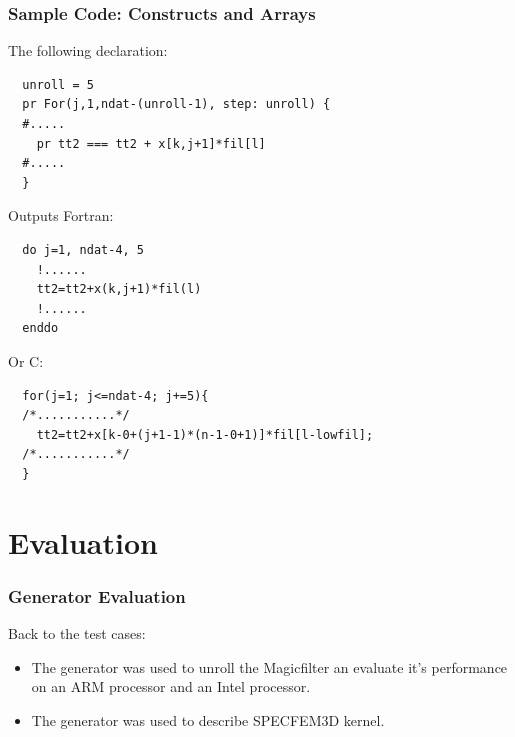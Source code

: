 \documentclass{beamer}
\begin{document}
\begin{frame}[fragile]
\frametitle{Sample Code: Constructs and Arrays}
The following declaration:
\tiny
{}
\begin{lstlisting}
  unroll = 5
  pr For(j,1,ndat-(unroll-1), step: unroll) {
  #.....
    pr tt2 === tt2 + x[k,j+1]*fil[l]
  #.....
  }
\end{lstlisting}
\normalsize 
Outputs Fortran:
\tiny
{}
\begin{lstlisting}
  do j=1, ndat-4, 5
    !......
    tt2=tt2+x(k,j+1)*fil(l)
    !......
  enddo
\end{lstlisting}
\normalsize
Or C:
\tiny
{}
\begin{lstlisting}
  for(j=1; j<=ndat-4; j+=5){
  /*...........*/
    tt2=tt2+x[k-0+(j+1-1)*(n-1-0+1)]*fil[l-lowfil];
  /*...........*/
  }
\end{lstlisting}
\end{frame}

\section{Evaluation}
\begin{frame}
\frametitle{Generator Evaluation}
Back to the test cases:
\begin{itemize}
\item The generator was used to unroll the Magicfilter an evaluate it's performance on an ARM processor and an Intel processor.
\item The generator was used to describe SPECFEM3D kernel.
\end{itemize}

\end{frame}
\end{document}
